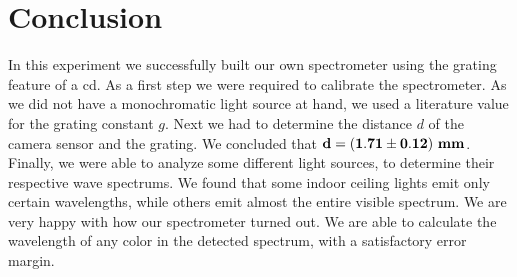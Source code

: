 \section{Conclusion}
    In this experiment we successfully built our own spectrometer using the grating feature of a cd.
    As a first step we were required to calibrate the spectrometer.
    As we did not have a monochromatic light source at hand, we used a literature value for the grating
    constant $g$. Next we had to determine the distance $d$ of the camera sensor and the grating.
    We concluded that $\bf d = (1.71 \pm 0.12) ~\si{\bf\milli\meter}$.
    Finally, we were able to analyze some different light sources, to determine their respective wave spectrums.
    We found that some indoor ceiling lights emit only certain wavelengths, while others emit almost the entire
    visible spectrum.
    We are very happy with how our spectrometer turned out. We are able to calculate the wavelength of any color
    in the detected spectrum, with a satisfactory error margin.

